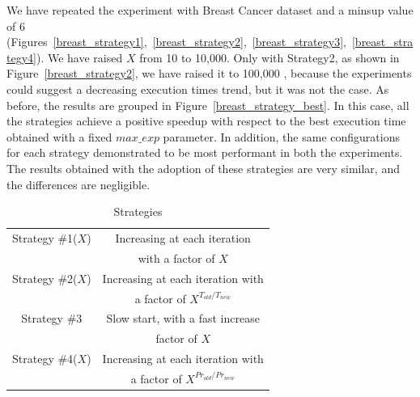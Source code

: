 We have repeated the experiment with Breast Cancer dataset and a minsup value of 6 (Figures~\ref{breast_strategy1},~\ref{breast_strategy2},~\ref{breast_strategy3},~\ref{breast_strategy4}). We have raised $X$ from 10 to 10,000. Only with Strategy2, as shown in Figure~\ref{breast_strategy2}, we have raised it to 100,000 , because the experiments could suggest a decreasing execution times trend, but it was not the case.
As before, the results are grouped in Figure~\ref{breast_strategy_best}.
In this case, all the strategies achieve a positive speedup with respect to the best execution time obtained with a fixed $max\_exp$ parameter. In addition, the same configurations for each strategy demonstrated to be most performant in both the experiments.
The results obtained with the adoption of these strategies are very similar, and the differences are negligible.



\begin{table}
\begin{center}
\caption{Strategies}
\label{table_strategies}
\begin{tabular}{|c|c|}
\hline
Strategy \#1($X$)  & Increasing at each iteration      \\ 
                   & with a factor of $X$               \\ \hline

Strategy \#2($X$)  & Increasing at each iteration with \\
                   & a factor of $X^{T_{old} / T_{new}}$                   \\ \hline

Strategy \#3       & Slow start, with a fast increase                      \\ 
     & factor of   $X$                     \\ \hline
Strategy \#4($X$) & Increasing at each iteration with \\
                   & a factor of $X^{Pr_{old} / Pr_{new}}$                    \\ \hline
            
\end{tabular}
\end{center}
\end{table}

